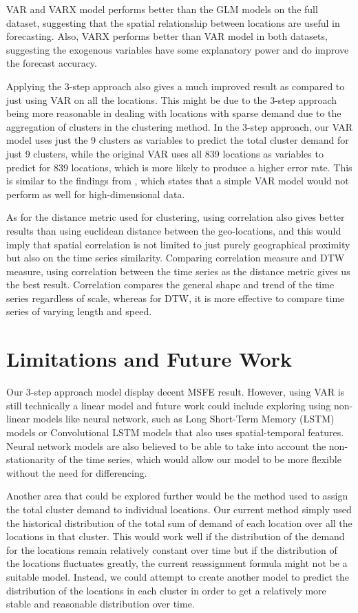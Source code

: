 \documentclass[12pt, letterpaper] {article}
\begin{document}
\noindent VAR and VARX model performs better than the GLM models on the full dataset, suggesting that the spatial relationship between locations are useful in forecasting. Also, VARX performs better than VAR model in both datasets, suggesting the exogenous variables have some explanatory power and do improve the forecast accuracy. 

\noindent Applying the 3-step approach also gives a much improved result as compared to just using VAR on all the locations. This might be due to the 3-step approach being more reasonable in dealing with locations with sparse demand due to the aggregation of clusters in the clustering method. In the 3-step approach, our VAR model uses just the 9 clusters as variables to predict the total cluster demand for just 9 clusters, while the original VAR uses all 839 locations as variables to predict for 839 locations, which is more likely to produce a higher error rate. This is similar to the findings from \cite{Abolfazl2017}, which states that a simple VAR model would not perform as well for high-dimensional data. 

\noindent As for the distance metric used for clustering, using correlation also gives better results than using euclidean distance between the geo-locations, and this would imply that spatial correlation is not limited to just purely geographical proximity but also on the time series similarity. Comparing correlation measure and DTW measure, using correlation between the time series as the distance metric gives us the best result. Correlation compares the general shape and trend of the time series regardless of scale, whereas for DTW, it is more effective to compare time series of varying length and speed. 

\section{Limitations and Future Work}
Our 3-step approach model display decent MSFE result. However, using VAR is still technically a linear model and future work could include exploring using non-linear models like neural network, such as Long Short-Term Memory (LSTM) models or Convolutional LSTM models that also uses spatial-temporal features. Neural network models are also believed to be able to take into account the non-stationarity of the time series, which would allow our model to be more flexible without the need for differencing. 

\noindent Another area that could be explored further would be the method used to assign the total cluster demand to individual locations. Our current method simply used the historical distribution of the total sum of demand of each location over all the locations in that cluster. This would work well if the distribution of the demand for the locations remain relatively constant over time but if the distribution of the locations fluctuates greatly, the current reassignment formula might not be a suitable model. Instead, we could attempt to create another model to predict the distribution of the locations in each cluster in order to get a relatively more stable and reasonable distribution over time.
\end{document}
